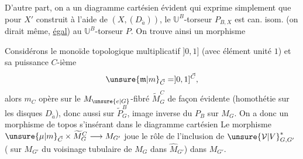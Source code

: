 D'autre part, on a un diagramme cartésien évident
qui exprime simplement que pour $X'$ construit à l'aide de $(X,(D_{\widetilde a}))$, le  $\mathbb U^B$-torseur $P_{B,X}$  est can. isom. (on dirait même, \uline{égal}) au $\mathbb U^B$-torseur $P$. On trouve ainsi un morphisme

Considérons le monoïde topologique multiplicatif $]0,1]$ (avec élément unité $1$) et sa puissance $C$-ième
\[
\unsure{\mathfrak m|m}_{\vec C}=]0,1]^{\vec C},
\]
\margin{il vaut mieux prendre $]0,1]^C$, sinon il y a des ``paramètres bidon''}
alors $m_C$ opère sur le $M_{\unsure{e|G}}$-fibré $\widetilde{M}_G^C$ de façon évidente (homothétie sur les disques $D_{\widetilde a}$),
donc aussi sur $\widetilde P_G^B$, image inverse du  $P_B$ sur $M_G$.
On a donc un  morphisme de topos
s'insérant dans le diagramme cartésien
Le  morphisme $\unsure{\mu|m}_{\vec C}\times\widetilde M_G^C\longrightarrow M_{G'}$ joue le rôle de l'inclusion de $\unsure{\mathcal V|V}_{G,G'}^*$  ( sur $M_{G'}$ du voisinage tubulaire de $M_G$ dans $\widehat M_{G'}$) dans $M_{G'}$.

